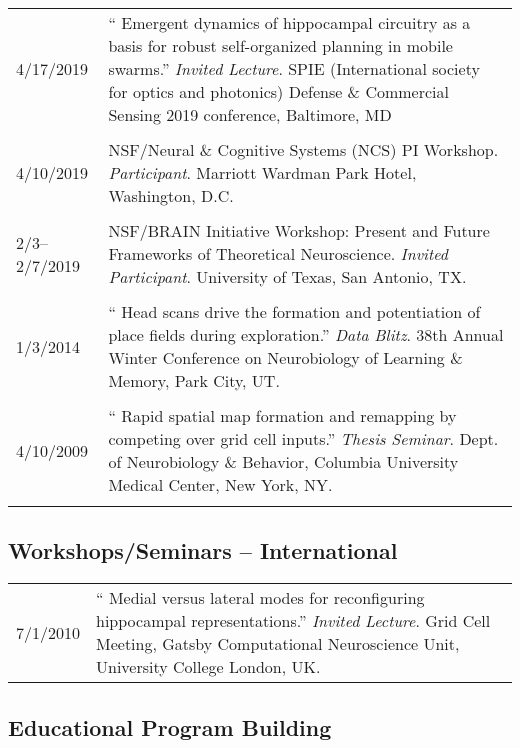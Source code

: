 \documentclass[10pt]{article}
\newcommand{\unpubtitle}[1]{{\color{hopkinsblue} #1}}
\begin{document}
\begin{tabular}{@{\hspace{0.2in}}l>{\raggedright\arraybackslash}p{}}
  4/17/2019 \hspace{0.3in} & ``\unpubtitle{Emergent dynamics of hippocampal
  circuitry as a basis for robust self-organized planning in mobile swarms}.''
  \emph{Invited Lecture}. SPIE (International society for optics and photonics)
  Defense \& Commercial Sensing 2019 conference, Baltimore, MD\\
  \tabularnewline
  4/10/2019 & NSF/Neural \& Cognitive Systems (NCS) PI
  Workshop. \emph{Participant}. Marriott Wardman Park Hotel, Washington, D.C.\\
  \tabularnewline
  2/3--2/7/2019 & NSF/BRAIN Initiative Workshop: Present and Future Frameworks
  of Theoretical Neuroscience. \emph{Invited Participant}. University of Texas,
  San Antonio, TX.\\
  \tabularnewline
  1/3/2014 & ``\unpubtitle{Head scans drive the formation and potentiation
  of place fields during exploration}.'' \emph{Data Blitz}. 38th Annual Winter
  Conference on Neurobiology of Learning \& Memory, Park City, UT.\\
  \tabularnewline
  4/10/2009 & ``\unpubtitle{Rapid spatial map formation and remapping by
  competing over grid cell inputs}.'' \emph{Thesis Seminar}. Dept. of Neurobiology
  \& Behavior, Columbia University Medical Center, New York, NY.\\
  \tabularnewline
\end{tabular}

\pagebreak
\subsection*{Workshops/Seminars -- International}

\begin{tabular}{@{\hspace{0.2in}}l>{\raggedright\arraybackslash}p{}}
  7/1/2010 \hspace{0.2in} & ``\unpubtitle{Medial versus lateral modes for
  reconfiguring hippocampal representations}.'' \emph{Invited Lecture}. Grid
  Cell Meeting, Gatsby Computational Neuroscience Unit, University College
  London, UK.\\
\end{tabular}

\smallskip
\subsection*{Educational Program Building}
\end{document}
